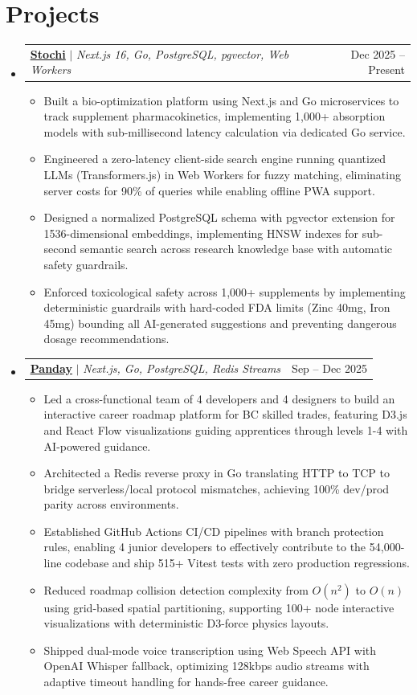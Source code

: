 \documentclass[a4paper,10pt]{article}
\makeatletter
\newcommand{\resumeItem}[1]{
  \item\small{
    {#1 \vspace{-1pt}}
  }
}
\newcommand{\resumeProjectHeading}[2]{
    \item
    \begin{tabular*}{0.97\textwidth}{l@{\extracolsep{\fill}}r}
      \small#1 & #2 \\
    \end{tabular*}\vspace{-6pt}
}
\newcommand{\resumeItemListStart}{\begin{itemize}[itemsep=2pt]}
\newcommand{\resumeItemListEnd}{\end{itemize}\vspace{-2pt}}
\makeatother
\begin{document}
\section{Projects}
    \begin{itemize}[leftmargin=0.15in, label={}]

      \resumeProjectHeading
          {\textbf{\href{https://github.com/nikitalobanov12/stochi }{\underline{Stochi}}} $|$ \emph{Next.js 16, Go, PostgreSQL, pgvector, Web Workers}}{Dec 2025 -- Present}
          \resumeItemListStart
            \resumeItem{Built a bio-optimization platform using Next.js and Go microservices to track supplement pharmacokinetics, implementing 1,000+ absorption models with sub-millisecond latency calculation via dedicated Go service.}
            \resumeItem{Engineered a zero-latency client-side search engine running quantized LLMs (Transformers.js) in Web Workers for fuzzy matching, eliminating server costs for 90\% of queries while enabling offline PWA support.}
            \resumeItem{Designed a normalized PostgreSQL schema with pgvector extension for 1536-dimensional embeddings, implementing HNSW indexes for sub-second semantic search across research knowledge base with automatic safety guardrails.}
            \resumeItem{Enforced toxicological safety across 1,000+ supplements by implementing deterministic guardrails with hard-coded FDA limits (Zinc 40mg, Iron 45mg) bounding all AI-generated suggestions and preventing dangerous dosage recommendations.}
          \resumeItemListEnd

     \resumeProjectHeading
          {\textbf{\href{https://github.com/panday-team/panday }{\underline{Panday}}} $|$ \emph{Next.js, Go, PostgreSQL, Redis Streams}}{Sep -- Dec 2025}
          \resumeItemListStart
            \resumeItem{Led a cross-functional team of 4 developers and 4 designers to build an interactive career roadmap platform for BC skilled trades, featuring D3.js and React Flow visualizations guiding apprentices through levels 1-4 with AI-powered guidance.}
            \resumeItem{Architected a Redis reverse proxy in Go translating HTTP to TCP to bridge serverless/local protocol mismatches, achieving 100\% dev/prod parity across environments.}
            \resumeItem{Established GitHub Actions CI/CD pipelines with branch protection rules, enabling 4 junior developers to effectively contribute to the 54,000-line codebase and ship 515+ Vitest tests with zero production regressions.}
            \resumeItem{Reduced roadmap collision detection complexity from $O(n^2)$ to $O(n)$ using grid-based spatial partitioning, supporting 100+ node interactive visualizations with deterministic D3-force physics layouts.}
            \resumeItem{Shipped dual-mode voice transcription using Web Speech API with OpenAI Whisper fallback, optimizing 128kbps audio streams with adaptive timeout handling for hands-free career guidance.}
          \resumeItemListEnd

    \end{itemize}
\end{document}
